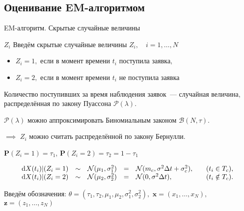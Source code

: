 \documentclass[utf8,handout]{beamer}
\begin{document}
\subsection[EM-алгоритм]{Оценивание EM-алгоритмом}
\begin{frame}{EM-алгоритм. Скрытые случайные величины}
\begin{block}{$Z_i$}
  Введём скрытые случайные величины $Z_i, \quad i=1,\ldots,N$
  \begin{itemize}
    \item $Z_i = 1,$ если в момент времени $t_i$ поступила заявка,
    \item $Z_i = 2,$ если в момент времени $t_i$ не поступила заявка
  \end{itemize}
  Количество поступивших за время наблюдения заявок~--- случайная величина, 
  распределённая по закону Пуассона $\mathcal{P}(\lambda).$

  $\mathcal{P}(\lambda)$ можно аппроксимировать Биномиальным законом 
  $\mathcal{B}(N, \tau).$

  $\implies$ $Z_i$ можно считать распределённой по закону Бернулли.

  $\mathbf{P}(Z_i=1) = \tau_1$, $\mathbf{P}(Z_i=2) = \tau_2 = 1 - \tau_1$
\end{block}

$$
\begin{array}{rclcll}
\dif X(t_i) \vert (Z_i = 1) &\sim& \mathcal{N}(\mu_1, \sigma_1^2) &=& 
  \mathcal{N}(m_c, \sigma^2 \Delta t + \sigma_c^2), &
  \quad (t_i \in T_c), \\
\dif X(t_i) \vert (Z_i = 2) &\sim& \mathcal{N}(\mu_2, \sigma_2^2) &=& 
  \mathcal{N}(0, \sigma^2 \Delta t), &
  \quad (t_i \notin T_c).
\end{array}
$$

Введём обозначения: 
$\theta = (\tau_1, \tau_2, \mu_1, \mu_2, \sigma_1^2, \sigma_2^2),$
$\mathbf{x} = (x_1, \ldots, x_N),$
$\mathbf{z} = (z_1, \ldots, z_N)$
\end{frame}
\end{document}
